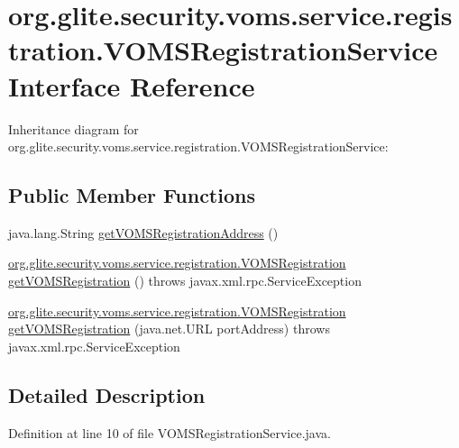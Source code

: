 \hypertarget{interfaceorg_1_1glite_1_1security_1_1voms_1_1service_1_1registration_1_1VOMSRegistrationService}{
\section{org.glite.security.voms.service.registration.VOMSRegistrationService Interface Reference}
\label{interfaceorg_1_1glite_1_1security_1_1voms_1_1service_1_1registration_1_1VOMSRegistrationService}
}


Inheritance diagram for org.glite.security.voms.service.registration.VOMSRegistrationService:
\subsection*{Public Member Functions}
\begin{DoxyCompactItemize}
\item 
java.lang.String \hyperlink{interfaceorg_1_1glite_1_1security_1_1voms_1_1service_1_1registration_1_1VOMSRegistrationService_ac5e74e6684713b9880a717da20478e80}{getVOMSRegistrationAddress} ()
\item 
\hyperlink{interfaceorg_1_1glite_1_1security_1_1voms_1_1service_1_1registration_1_1VOMSRegistration}{org.glite.security.voms.service.registration.VOMSRegistration} \hyperlink{interfaceorg_1_1glite_1_1security_1_1voms_1_1service_1_1registration_1_1VOMSRegistrationService_a57d3ef89895c9fe44c48a1a27fb7a9c0}{getVOMSRegistration} ()  throws javax.xml.rpc.ServiceException
\item 
\hyperlink{interfaceorg_1_1glite_1_1security_1_1voms_1_1service_1_1registration_1_1VOMSRegistration}{org.glite.security.voms.service.registration.VOMSRegistration} \hyperlink{interfaceorg_1_1glite_1_1security_1_1voms_1_1service_1_1registration_1_1VOMSRegistrationService_a0833a75c9bcd4ff1f3d392f1fe82991c}{getVOMSRegistration} (java.net.URL portAddress)  throws javax.xml.rpc.ServiceException
\end{DoxyCompactItemize}


\subsection{Detailed Description}


Definition at line 10 of file VOMSRegistrationService.java.



